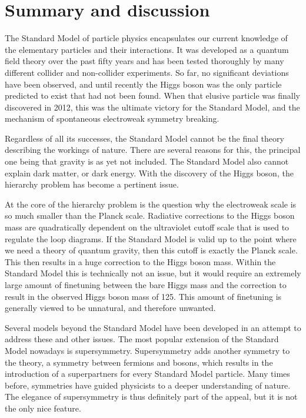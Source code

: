 \chapter{Summary and discussion \label{chap:summary}}

The Standard Model of particle physics encapsulates our current knowledge of the elementary
particles and their interactions. It was developed as a quantum field theory
over the past fifty years and has been tested thoroughly by many different collider and
non-collider experiments. So far, no significant deviations have been observed, and until recently
the Higgs boson was the only particle predicted to exist that had not been found. 
When that elusive particle was finally discovered in 2012, this was the ultimate victory for the
Standard Model, and the mechanism of spontaneous electroweak symmetry breaking. 

Regardless of all its successes, the Standard Model cannot be the final theory describing the
workings of nature. There are several reasons for this, the principal one being that gravity is
as yet not included. The Standard Model also cannot explain dark matter, or dark energy. 
With the discovery of the Higgs boson, the hierarchy problem has become a pertinent issue. 

At the core of the hierarchy problem is the question why the electroweak scale is so much smaller
than the Planck scale. Radiative corrections to the Higgs boson mass are quadratically dependent on
the ultraviolet cutoff scale that is used to regulate the loop diagrams. If the Standard Model is
valid up to the point where we need a theory of quantum gravity, then this cutoff is exactly the
Planck scale. This then results in a huge correction to the Higgs boson mass. Within the Standard
Model this is technically not an issue, but it would require an extremely large amount of
finetuning between the bare Higgs mass and the correction to result in the observed Higgs boson
mass of 125\GeV. This amount of finetuning is generally viewed to be unnatural, and therefore
unwanted. 

Several models beyond the Standard Model have been developed in an attempt to address these and
other issues. The most popular extension of the Standard Model nowadays is supersymmetry.
Supersymmetry adds another symmetry to the theory, a symmetry between fermions and bosons, which
results in the introduction of a superpartners for every Standard Model particle. 
Many times before, symmetries have guided physicists to a deeper understanding of nature. 
The elegance of supersymmetry is thus definitely part of the appeal, but it is not the only nice
feature. 

